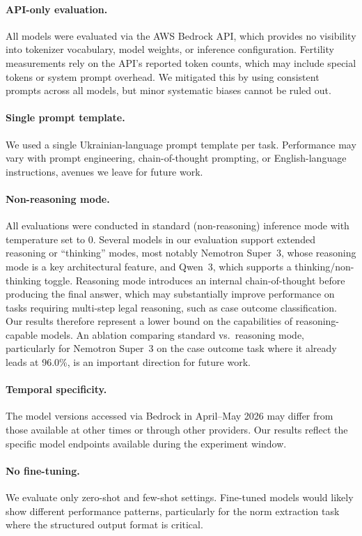 \documentclass[11pt,a4paper]{article}
\begin{document}
\paragraph{API-only evaluation.} All models were evaluated via the AWS Bedrock API, which provides no visibility into tokenizer vocabulary, model weights, or inference configuration. Fertility measurements rely on the API's reported token counts, which may include special tokens or system prompt overhead. We mitigated this by using consistent prompts across all models, but minor systematic biases cannot be ruled out.

\paragraph{Single prompt template.} We used a single Ukrainian-language prompt template per task. Performance may vary with prompt engineering, chain-of-thought prompting, or English-language instructions, avenues we leave for future work.

\paragraph{Non-reasoning mode.} All evaluations were conducted in standard (non-reasoning) inference mode with temperature set to 0. Several models in our evaluation support extended reasoning or ``thinking'' modes, most notably Nemotron Super~3, whose reasoning mode is a key architectural feature, and Qwen~3, which supports a thinking/non-thinking toggle. Reasoning mode introduces an internal chain-of-thought before producing the final answer, which may substantially improve performance on tasks requiring multi-step legal reasoning, such as case outcome classification. Our results therefore represent a lower bound on the capabilities of reasoning-capable models. An ablation comparing standard vs.\ reasoning mode, particularly for Nemotron Super~3 on the case outcome task where it already leads at 96.0\%, is an important direction for future work.

\paragraph{Temporal specificity.} The model versions accessed via Bedrock in April--May 2026 may differ from those available at other times or through other providers. Our results reflect the specific model endpoints available during the experiment window.

\paragraph{No fine-tuning.} We evaluate only zero-shot and few-shot settings. Fine-tuned models would likely show different performance patterns, particularly for the norm extraction task where the structured output format is critical.
\end{document}
